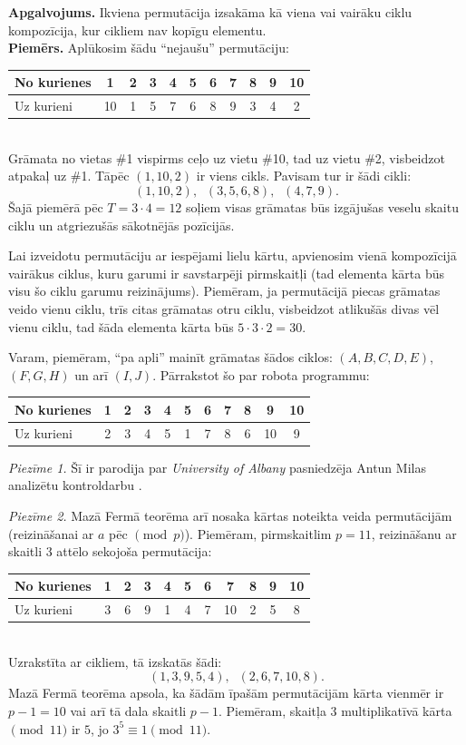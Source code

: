 \documentclass[a4paper,12pt]{article}
\begin{document}
\begin{problem}
{{\bf Apgalvojums.} Ikviena permutācija izsakāma kā viena vai vairāku ciklu kompozīcija, 
kur cikliem nav kopīgu elementu.\\
{\bf Piemērs.} Aplūkosim šādu ``nejaušu'' permutāciju:\\
\begin{tabular}{|l|c|c|c|c|c|c|c|c|c|c|} \hline
No kurienes & 1 & 2 & 3 & 4 & 5 & 6 & 7 & 8 & 9 & 10 \\ \hline
Uz kurieni & 10 & 1 & 5 & 7 & 6 & 8 & 9 & 3 & 4 & 2 \\ \hline
\end{tabular}\\
Grāmata no vietas \#1 vispirms ceļo uz vietu \#10, tad uz vietu \#2, visbeidzot atpakaļ uz \#1. 
Tāpēc $(1,10,2)$ ir viens cikls. Pavisam tur ir šādi cikli: 
\[ (1,10,2),\;\;(3,5,6,8),\;\;(4,7,9). \]
Šajā piemērā pēc $T=3 \cdot 4 = 12$ soļiem
visas grāmatas būs izgājušas veselu skaitu ciklu un atgriezušās sākotnējās pozīcijās.

Lai izveidotu permutāciju ar iespējami lielu kārtu, apvienosim vienā kompozīcijā vairākus
ciklus, kuru garumi ir savstarpēji pirmskaitļi (tad elementa kārta būs visu šo ciklu garumu
reizinājums). Piemēram, ja permutācijā pie\-cas grāmatas veido vienu ciklu, trīs citas grāmatas
otru ciklu, visbeidzot atlikušās divas vēl vienu ciklu, tad
šāda elementa kārta būs $5 \cdot 3 \cdot 2 = 30$.

Varam, piemēram, ``pa apli'' mainīt grāmatas šādos ciklos: 
$(A,\allowbreak{}B,\allowbreak{}C,\allowbreak{}D,\allowbreak{}E)$, $(F,\allowbreak{}G,\allowbreak{}H)$ un arī $(I,\allowbreak{}J)$.
Pārrakstot šo par robota programmu:

\vspace{4pt}
\begin{tabular}{|l|c|c|c|c|c||c|c|c||c|c|} \hline
No kurienes & 1 & 2 & 3 & 4 & 5 & 6 & 7 & 8 & 9 & 10 \\ \hline
Uz kurieni & 2 & 3 & 4 & 5 & 1 & 7 & 8 & 6 & 10 & 9 \\ \hline
\end{tabular}

{\em Piezīme 1.} Šī ir parodija par {\em University of Albany} pasniedzēja
Antun Milas analizētu kontroldarbu \cite{Milas2015}.

{\em Piezīme 2.} Mazā Fermā teorēma arī nosaka kārtas noteikta veida permutācijām (reizināšanai ar $a$ pēc 
$\pmod{p}$). Piemēram, pirmskaitlim $p=11$, reizināšanu ar skaitli $3$ attēlo sekojoša permutācija:\\
\begin{tabular}{|l|c|c|c|c|c|c|c|c|c|c|} \hline
No kurienes & 1 & 2 & 3 & 4 & 5 & 6 & 7 & 8 & 9 & 10 \\ \hline
Uz kurieni & 3 & 6 & 9 & 1 & 4 & 7 & 10 & 2 & 5 & 8 \\ \hline
\end{tabular}\\
Uzrakstīta ar cikliem, tā izskatās šādi: 
\[ (1,3,9,5,4),\;\;(2,6,7,10,8). \] 
Mazā Fermā teorēma apsola, ka šādām īpašām permutācijām kārta vienmēr ir $p-1 = 10$ 
vai arī tā dala skaitli $p-1$. Piemēram, skaitļa $3$ multiplikatīvā kārta $\pmod{11}$ ir $5$, jo 
$3^5 \equiv 1 \pmod{11}$. 
}
\end{problem}
\end{document}
